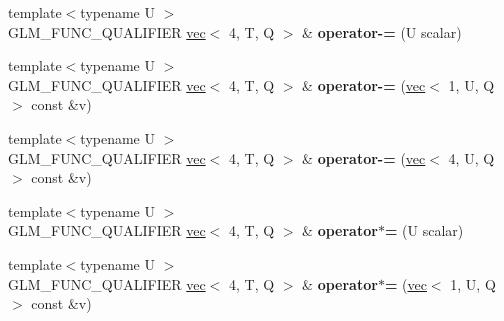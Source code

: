 \begin{DoxyCompactItemize}
\item 
\mbox{\label{structglm_1_1vec_3_014_00_01T_00_01Q_01_4_aea3f23ac07ef99b7189102d95bf26a85}} 
{\footnotesize template$<$typename U $>$ }\\G\+L\+M\+\_\+\+F\+U\+N\+C\+\_\+\+Q\+U\+A\+L\+I\+F\+I\+ER \hyperlink{structglm_1_1vec}{vec}$<$ 4, T, Q $>$ \& {\bfseries operator-\/=} (U scalar)
\item 
\mbox{\label{structglm_1_1vec_3_014_00_01T_00_01Q_01_4_abad73477e54831bdea3d23dfb24ce436}} 
{\footnotesize template$<$typename U $>$ }\\G\+L\+M\+\_\+\+F\+U\+N\+C\+\_\+\+Q\+U\+A\+L\+I\+F\+I\+ER \hyperlink{structglm_1_1vec}{vec}$<$ 4, T, Q $>$ \& {\bfseries operator-\/=} (\hyperlink{structglm_1_1vec}{vec}$<$ 1, U, Q $>$ const \&v)
\item 
\mbox{\label{structglm_1_1vec_3_014_00_01T_00_01Q_01_4_ae943070d1a4e295555306d52eab887c4}} 
{\footnotesize template$<$typename U $>$ }\\G\+L\+M\+\_\+\+F\+U\+N\+C\+\_\+\+Q\+U\+A\+L\+I\+F\+I\+ER \hyperlink{structglm_1_1vec}{vec}$<$ 4, T, Q $>$ \& {\bfseries operator-\/=} (\hyperlink{structglm_1_1vec}{vec}$<$ 4, U, Q $>$ const \&v)
\item 
\mbox{\label{structglm_1_1vec_3_014_00_01T_00_01Q_01_4_ada4128504595a3a6aae32660a1461dea}} 
{\footnotesize template$<$typename U $>$ }\\G\+L\+M\+\_\+\+F\+U\+N\+C\+\_\+\+Q\+U\+A\+L\+I\+F\+I\+ER \hyperlink{structglm_1_1vec}{vec}$<$ 4, T, Q $>$ \& {\bfseries operator$\ast$=} (U scalar)
\item 
\mbox{\label{structglm_1_1vec_3_014_00_01T_00_01Q_01_4_af1a51a8de8525cfcb5273513daaf1b04}} 
{\footnotesize template$<$typename U $>$ }\\G\+L\+M\+\_\+\+F\+U\+N\+C\+\_\+\+Q\+U\+A\+L\+I\+F\+I\+ER \hyperlink{structglm_1_1vec}{vec}$<$ 4, T, Q $>$ \& {\bfseries operator$\ast$=} (\hyperlink{structglm_1_1vec}{vec}$<$ 1, U, Q $>$ const \&v)
\item 
\mbox{\label{structglm_1_1vec_3_014_00_01T_00_01Q_01_4_a8223cbe0c80067bda5e8a87ebc4098cf}} 

\end{DoxyCompactItemize}

